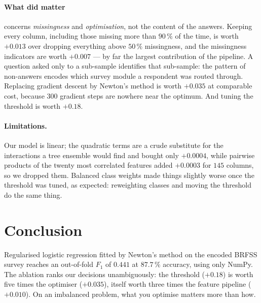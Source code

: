 \documentclass[10pt,conference,compsocconf]{IEEEtran}
\begin{document}
\paragraph{What did matter} concerns \emph{missingness} and
\emph{optimisation}, not the content of the answers. Keeping every column,
including those missing more than $90\,\%$ of the time, is worth $+0.013$ over
dropping everything above $50\,\%$ missingness, and the missingness indicators
are worth $+0.007$ --- by far the largest contribution of the pipeline. A
question asked only to a sub-sample identifies that sub-sample: the pattern of
non-answers encodes which survey module a respondent was routed through.
Replacing gradient descent by Newton's method is worth $+0.035$ at comparable
cost, because $300$ gradient steps are nowhere near the optimum. And tuning the
threshold is worth $+0.18$.

\paragraph{Limitations.} Our model is linear; the quadratic terms are a crude
substitute for the interactions a tree ensemble would find and bought only
$+0.0004$, while pairwise products of the twenty most correlated features added
$+0.0003$ for $145$ columns, so we dropped them. Balanced class weights made
things slightly worse once the threshold was tuned, as expected: reweighting
classes and moving the threshold do the same thing.

\section{Conclusion}

Regularised logistic regression fitted by Newton's method on the encoded BRFSS
survey reaches an out-of-fold $F_1$ of $0.441$ at $87.7\,\%$ accuracy, using
only NumPy. The ablation ranks our decisions unambiguously: the threshold
($+0.18$) is worth five times the optimiser ($+0.035$), itself worth three
times the feature pipeline ($+0.010$). On an imbalanced problem, what you
optimise matters more than how.
\end{document}
